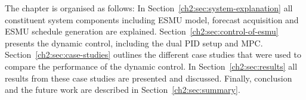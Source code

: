 The chapter is organised as follows:
In Section~\ref{ch2:sec:system-explanation} all constituent system components including ESMU model, forecast acquisition and ESMU schedule generation are explained.
Section~\ref{ch2:sec:control-of-esmu} presents the dynamic control, including the dual PID setup and MPC.
Section~\ref{ch2:sec:case-studies} outlines the different case studies that were used to compare the performance of the dynamic control.
In Section~\ref{ch2:sec:results} all results from these case studies are presented and discussed.
Finally, conclusion and the future work are described in Section~\ref{ch2:sec:summary}.











